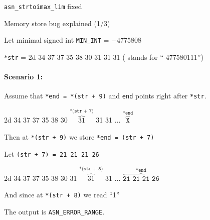 \documentclass[10pt]{beamer}
\begin{document}
\begin{frame}{\texttt{asn\_strtoimax\_lim} fixed}
  
    {\fontsize{4}{1}\selectfont }

\end{frame}
  

\begin{frame}{Memory store bug explained (1/3)}

    Let minimal signed int \texttt{MIN\_INT} = $-4775808$ 

    \texttt{*str} = {\color{red}2d 34 37 37 35 38 30 31 31 31} ( stands for ``-477580111'') 

    \paragraph{{\bf Scenario 1}:}

    Assume that \texttt{*end = *(str + 9)} and  \texttt{end} points right after \texttt{*str}.

     {\color{red}2d 34 37 37 35 38 30 {\color{blue}$\overbrace{31}^{\texttt{*(str + 7)}}$} 31 31 $\ldots$ $\overbrace{\texttt{X}}^{\texttt{*end}}$}

     Then at \texttt{*(str + 9)} we store \texttt{*end = (str + 7)}

     Let \texttt{(str + 7) = 21 21 21 26} 

     {\color{red}2d 34 37 37 35 38 30 31 {\color{blue} $\overbrace{31}^{\texttt{*(str + 8)}}$} 31  $\ldots$ $\overbrace{\texttt{21 21 21 26}}^{\texttt{*end}}$}
     
     And since at \texttt{*(str + 8)} we read ``1''
     

     
     The output is  \color{green}\texttt{ASN\_ERROR\_RANGE}.


  \end{frame}
\end{document}

